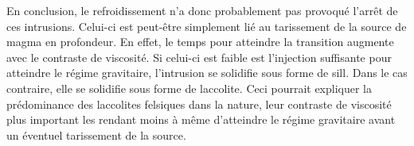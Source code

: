En conclusion, le refroidissement n’a donc probablement pas provoqué
l’arrêt de ces intrusions. Celui-ci est peut-être simplement lié au
tarissement de la source de magma en profondeur. En effet, le temps
pour atteindre la transition augmente avec le contraste de viscosité. Si celui-ci est faible est l'injection suffisante pour atteindre le
régime gravitaire, l'intrusion se solidifie sous forme de sill. Dans
le cas contraire, elle se solidifie sous forme de laccolite. Ceci
pourrait expliquer la prédominance des laccolites felsiques dans la
nature, leur contraste de viscosité plus important les rendant moins à
même d'atteindre le régime gravitaire avant un éventuel tarissement de
la source.

